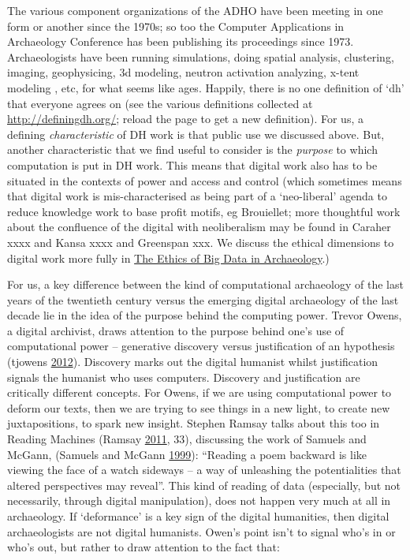 \documentclass[english,]{book}
\begin{document}
The various component organizations of the ADHO have been meeting in one
form or another since the 1970s; so too the Computer Applications in
Archaeology Conference has been publishing its proceedings since 1973.
Archaeologists have been running simulations, doing spatial analysis,
clustering, imaging, geophysicing, 3d modeling, neutron activation
analyzing, x-tent modeling , etc, for what seems like ages. Happily,
there is no one definition of `dh' that everyone agrees on (see the
various definitions collected at \url{http://definingdh.org/}; reload
the page to get a new definition). For us, a defining
\emph{characteristic} of DH work is that public use we discussed above.
But, another characteristic that we find useful to consider is the
\emph{purpose} to which computation is put in DH work. This means that
digital work also has to be situated in the contexts of power and access
and control (which sometimes means that digital work is
mis-characterised as being part of a `neo-liberal' agenda to reduce
knowledge work to base profit motifs, eg Brouiellet; more thoughtful
work about the confluence of the digital with neoliberalism may be found
in Caraher xxxx and Kansa xxxx and Greenspan xxx. We discuss the ethical
dimensions to digital work more fully in
\protect\hyperlink{the-ethics-of-big-data-in-archaeology}{The Ethics of
Big Data in Archaeology}.)

For us, a key difference between the kind of computational archaeology
of the last years of the twentieth century versus the emerging digital
archaeology of the last decade lie in the idea of the purpose behind the
computing power. Trevor Owens, a digital archivist, draws attention to
the purpose behind one's use of computational power -- generative
discovery versus justification of an hypothesis (tjowens
\protect\hyperlink{ref-tjowens_discovery_2012}{2012}). Discovery marks
out the digital humanist whilst justification signals the humanist who
uses computers. Discovery and justification are critically different
concepts. For Owens, if we are using computational power to deform our
texts, then we are trying to see things in a new light, to create new
juxtapositions, to spark new insight. Stephen Ramsay talks about this
too in Reading Machines (Ramsay
\protect\hyperlink{ref-ramsay_reading_2011}{2011}, 33), discussing the
work of Samuels and McGann, (Samuels and McGann
\protect\hyperlink{ref-samuels_deformance_1999}{1999}): ``Reading a poem
backward is like viewing the face of a watch sideways -- a way of
unleashing the potentialities that altered perspectives may reveal''.
This kind of reading of data (especially, but not necessarily, through
digital manipulation), does not happen very much at all in archaeology.
If `deformance' is a key sign of the digital humanities, then digital
archaeologists are not digital humanists. Owen's point isn't to signal
who's in or who's out, but rather to draw attention to the fact that:
\end{document}
